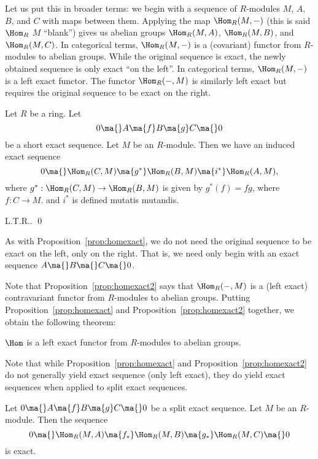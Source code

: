 Let us put this in broader terms: we begin with a sequence of $R$-modules $M$, $A$, $B$, and $C$ with maps between them. Applying the map $\Hom_R(M,-)$ (this is said $\Hom_R$ $M$ ``blank'') gives us abelian groups $\Hom_R(M,A)$, $\Hom_R(M,B)$, and $\Hom_R(M,C)$. In categorical terms, $\Hom_R(M,-)$ is a (covariant) functor from $R$-modules to abelian groups. While the original sequence is exact, the newly obtained sequence is only exact ``on the left''. In categorical terms, $\Hom_R(M,-)$ is a left exact functor. The functor $\Hom_R(-,M)$ is similarly left exact but requires the original sequence to be exact on the right.


\begin{prop} \label{prop:homexact2}
Let $R$ be a ring. Let
	\[
	0 \ma{} A \ma{f} B \ma{g} C \ma{} 0
	\]
be a short exact sequence. Let $M$ be an $R$-module. Then we have an induced exact sequence
	\[
	0 \ma{} \Hom_R(C,M) \ma{g^*} \Hom_R(B,M) \ma{i^*} \Hom_R(A,M),
	\]
where $g^*: \Hom_R(C,M) \to \Hom_R(B,M)$ is given by $g^*(f)=fg$, where $f: C \to M$. and $i^*$ is defined mutatis mutandis. 
\end{prop}

\pf L.T.R.. \qed \\


\begin{rem}
As with Proposition~\ref{prop:homexact}, we do not need the original sequence to be exact on the left, only on the right. That is, we need only begin with an exact sequence $A \ma{} B \ma{} C \ma{} 0$.
\end{rem}


Note that Proposition~\ref{prop:homexact2} says that $\Hom_R(-,M)$ is a (left exact) contravariant functor from $R$-modules to abelian groups. Putting Proposition~\ref{prop:homexact} and Proposition~\ref{prop:homexact2} together, we obtain the following theorem:


\begin{thm}
$\Hom$ is a left exact functor from $R$-modules to abelian groups. 
\end{thm}


Note that while Proposition~\ref{prop:homexact} and Proposition~\ref{prop:homexact2} do not generally yield exact sequence (only left exact), they do yield exact sequences when applied to split exact sequences.


\begin{prop}
Let $0 \ma{} A \ma{f} B \ma{g} C \ma{} 0$ be a split exact sequence. Let $M$ be an $R$-module. Then the sequence
	\[
	0 \ma{} \Hom_R(M,A) \ma{f_*} \Hom_R(M,B) \ma{g_*} \Hom_R(M,C) \ma{} 0
	\]
is exact.
\end{prop}

